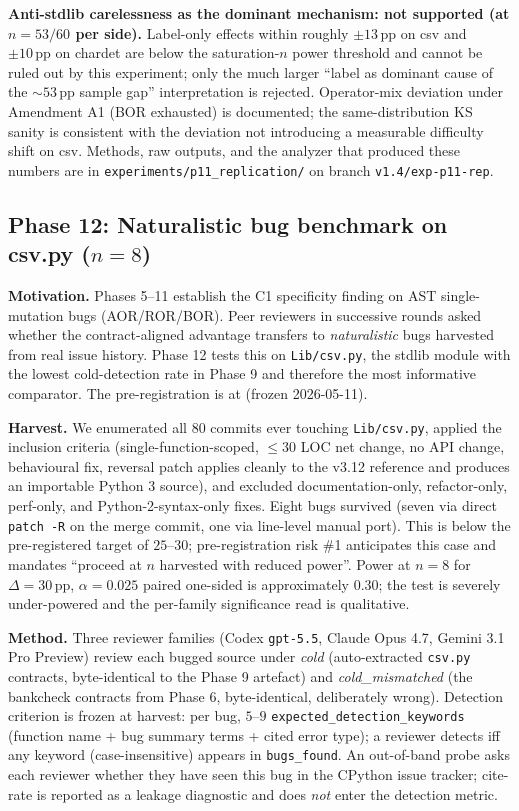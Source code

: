\textbf{Anti-stdlib carelessness as the dominant mechanism: not supported (at $n=53/60$ per side).} Label-only effects within roughly $\pm 13\,\mathrm{pp}$ on csv and $\pm 10\,\mathrm{pp}$ on chardet are below the saturation-$n$ power threshold and cannot be ruled out by this experiment; only the much larger ``label as dominant cause of the $\sim 53\,\mathrm{pp}$ sample gap'' interpretation is rejected. Operator-mix deviation under Amendment A1 (BOR exhausted) is documented; the same-distribution KS sanity is consistent with the deviation not introducing a measurable difficulty shift on csv. Methods, raw outputs, and the analyzer that produced these numbers are in \texttt{experiments/p11\_replication/} on branch \texttt{v1.4/exp-p11-rep}.

\subsection{Phase 12: Naturalistic bug benchmark on csv.py ($n = 8$)}
\label{sec:phase12}

\textbf{Motivation.} Phases 5--11 establish the C1 specificity finding on AST single-mutation bugs (AOR/ROR/BOR). Peer reviewers in successive rounds asked whether the contract-aligned advantage transfers to \emph{naturalistic} bugs harvested from real issue history. Phase 12 tests this on \texttt{Lib/csv.py}, the stdlib module with the lowest cold-detection rate in Phase 9 and therefore the most informative comparator. The pre-registration is at  (frozen 2026-05-11).

\textbf{Harvest.} We enumerated all $80$ commits ever touching \texttt{Lib/csv.py}, applied the inclusion criteria (single-function-scoped, $\le 30$ LOC net change, no API change, behavioural fix, reversal patch applies cleanly to the v3.12 reference and produces an importable Python 3 source), and excluded documentation-only, refactor-only, perf-only, and Python-2-syntax-only fixes. Eight bugs survived (seven via direct \texttt{patch -R} on the merge commit, one via line-level manual port). This is below the pre-registered target of $25$--$30$; pre-registration risk \#1 anticipates this case and mandates ``proceed at $n$ harvested with reduced power''. Power at $n = 8$ for $\Delta = 30\,\mathrm{pp}$, $\alpha = 0.025$ paired one-sided is approximately $0.30$; the test is severely under-powered and the per-family significance read is qualitative.

\textbf{Method.} Three reviewer families (Codex \texttt{gpt-5.5}, Claude Opus 4.7, Gemini 3.1 Pro Preview) review each bugged source under \emph{cold} (auto-extracted \texttt{csv.py} contracts, byte-identical to the Phase 9 artefact) and \emph{cold\_mismatched} (the bankcheck contracts from Phase 6, byte-identical, deliberately wrong). Detection criterion is frozen at harvest: per bug, $5$--$9$ \texttt{expected\_detection\_keywords} (function name + bug summary terms + cited error type); a reviewer detects iff any keyword (case-insensitive) appears in \texttt{bugs\_found}. An out-of-band probe asks each reviewer whether they have seen this bug in the CPython issue tracker; cite-rate is reported as a leakage diagnostic and does \emph{not} enter the detection metric.

